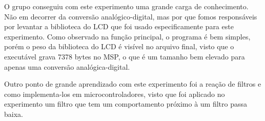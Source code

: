 


O grupo conseguiu com este experimento uma grande carga de conhecimento. Não em decorrer da conversão analógico-digital, mas por que fomos responsáveis por levantar a biblioteca do LCD que foi usado especificamente para este experimento. Como observado na função principal, o programa é bem simples, porém o peso da biblioteca do LCD é visível no arquivo final, visto que o executável grava 7378 bytes no MSP, o que é um tamanho bem elevado para apenas uma conversão analógica-digital. 

Outro ponto de grande aprendizado com este experimento foi a reação de filtros e como implementa-los em microcontroladores, visto que foi aplicado no experimento um filtro que tem um comportamento próximo à um filtro passa baixa.
